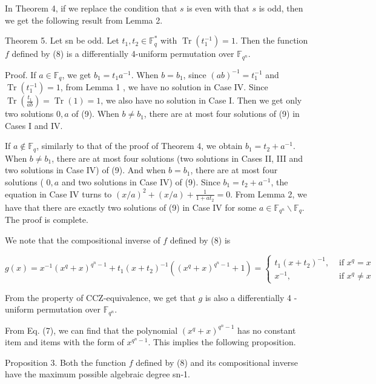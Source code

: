 \documentclass[10pt]{article}
\begin{document}
In Theorem 4, if we replace the condition that $s$ is even with that $s$ is odd, then we get the following result from Lemma 2.

Theorem 5. Let sn be odd. Let $t_{1}, t_{2} \in \mathbb{F}_{q}^{*}$ with $\operatorname{Tr}\left(t_{1}^{-1}\right)=1$. Then the function $f$ defined by (8) is a differentially 4-uniform permutation over $\mathbb{F}_{q^{n}}$.

Proof. If $a \in \mathbb{F}_{q}$, we get $b_{1}=t_{1} a^{-1}$. When $b=b_{1}$, since $(a b)^{-1}=t_{1}^{-1}$ and $\operatorname{Tr}\left(t_{1}^{-1}\right)=1$, from Lemma 1 , we have no solution in Case IV. Since $\operatorname{Tr}\left(\frac{t_{1}}{a b}\right)=\operatorname{Tr}(1)=1$, we also have no solution in Case I. Then we get only two solutions $0, a$ of (9). When $b \neq b_{1}$, there are at most four solutions of (9) in Cases I and IV.

If $a \notin \mathbb{F}_{q}$, similarly to that of the proof of Theorem 4, we obtain $b_{1}=t_{2}+a^{-1}$. When $b \neq b_{1}$, there are at most four solutions (two solutions in Cases II, III and two solutions in Case IV) of (9). And when $b=b_{1}$, there are at most four solutions ( $0, a$ and two solutions in Case IV) of (9). Since $b_{1}=t_{2}+a^{-1}$, the equation in Case IV turns to $(x / a)^{2}+(x / a)+\frac{1}{1+a t_{2}}=0$. From Lemma 2, we have that there are exactly two solutions of (9) in Case IV for some $a \in \mathbb{F}_{q^{n}} \backslash \mathbb{F}_{q}$. The proof is complete.

We note that the compositional inverse of $f$ defined by (8) is

$$
g(x)=x^{-1}\left(x^{q}+x\right)^{q^{n}-1}+t_{1}\left(x+t_{2}\right)^{-1}\left(\left(x^{q}+x\right)^{q^{n}-1}+1\right)= \begin{cases}t_{1}\left(x+t_{2}\right)^{-1}, & \text { if } x^{q}=x \\ x^{-1}, & \text { if } x^{q} \neq x\end{cases}
$$

From the property of CCZ-equivalence, we get that $g$ is also a differentially 4 -uniform permutation over $\mathbb{F}_{q^{n}}$.

From Eq. (7), we can find that the polynomial $\left(x^{q}+x\right)^{q^{n}-1}$ has no constant item and items with the form of $x^{q^{n}-1}$. This implies the following proposition.

Proposition 3. Both the function $f$ defined by (8) and its compositional inverse have the maximum possible algebraic degree sn-1.
\end{document}
